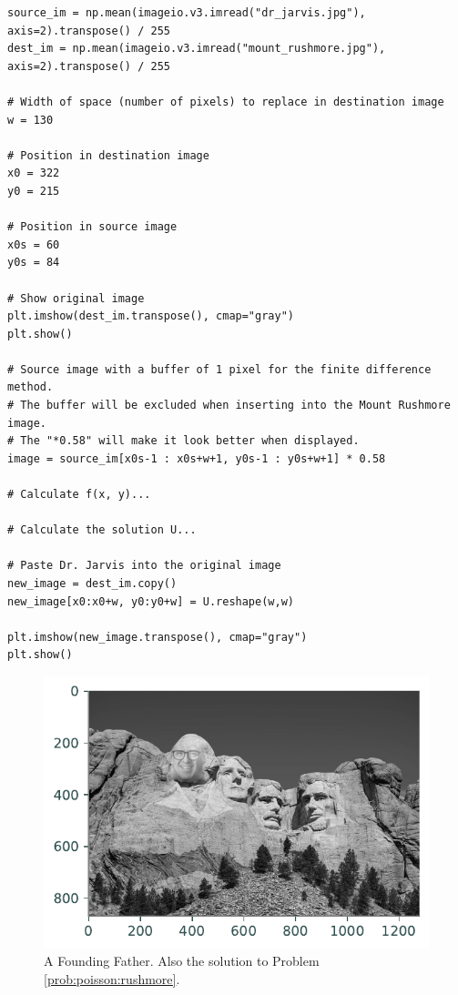 \begin{problem}
\begin{lstlisting}
source_im = np.mean(imageio.v3.imread("dr_jarvis.jpg"), axis=2).transpose() / 255
dest_im = np.mean(imageio.v3.imread("mount_rushmore.jpg"), axis=2).transpose() / 255

# Width of space (number of pixels) to replace in destination image
w = 130

# Position in destination image
x0 = 322
y0 = 215

# Position in source image
x0s = 60
y0s = 84

# Show original image
plt.imshow(dest_im.transpose(), cmap="gray")
plt.show()

# Source image with a buffer of 1 pixel for the finite difference method.
# The buffer will be excluded when inserting into the Mount Rushmore image.
# The "*0.58" will make it look better when displayed.
image = source_im[x0s-1 : x0s+w+1, y0s-1 : y0s+w+1] * 0.58

# Calculate f(x, y)...

# Calculate the solution U...

# Paste Dr. Jarvis into the original image
new_image = dest_im.copy()
new_image[x0:x0+w, y0:y0+w] = U.reshape(w,w)

plt.imshow(new_image.transpose(), cmap="gray")
plt.show()

\end{lstlisting}
\label{prob:poisson:rushmore}
\end{problem}

\begin{figure}[H]
\includegraphics[scale=0.7]{figures/mt_rushmore.pdf}
\caption{A Founding Father.
Also the solution to Problem \ref{prob:poisson:rushmore}.}
\label{poisson:mt_rushmore}
\end{figure}
